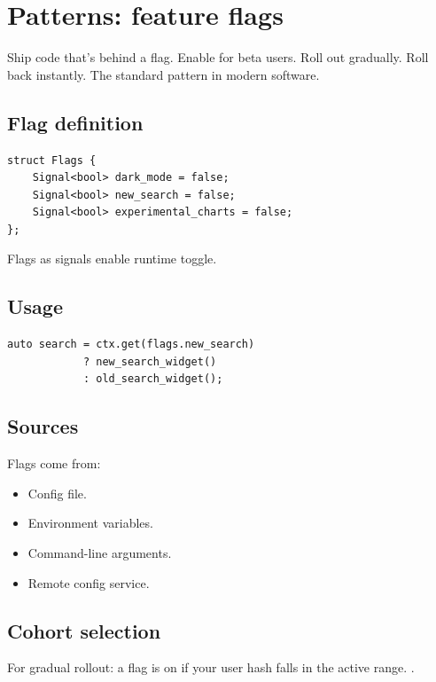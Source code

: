 \chapter{Patterns: feature flags}
\label{ch:flags}

\begin{aside}
Ship code that's behind a flag. Enable for beta users. Roll
out gradually. Roll back instantly. The standard pattern in
modern software.
\end{aside}

\section{Flag definition}

\begin{lstlisting}
struct Flags {
    Signal<bool> dark_mode = false;
    Signal<bool> new_search = false;
    Signal<bool> experimental_charts = false;
};
\end{lstlisting}

Flags as signals enable runtime toggle.

\section{Usage}

\begin{lstlisting}
auto search = ctx.get(flags.new_search)
            ? new_search_widget()
            : old_search_widget();
\end{lstlisting}

\section{Sources}

Flags come from:

\begin{itemize}[leftmargin=*]
  \item Config file.
  \item Environment variables.
  \item Command-line arguments.
  \item Remote config service.
\end{itemize}

\section{Cohort selection}

For gradual rollout: a flag is on if your user hash falls
in the active range. .


